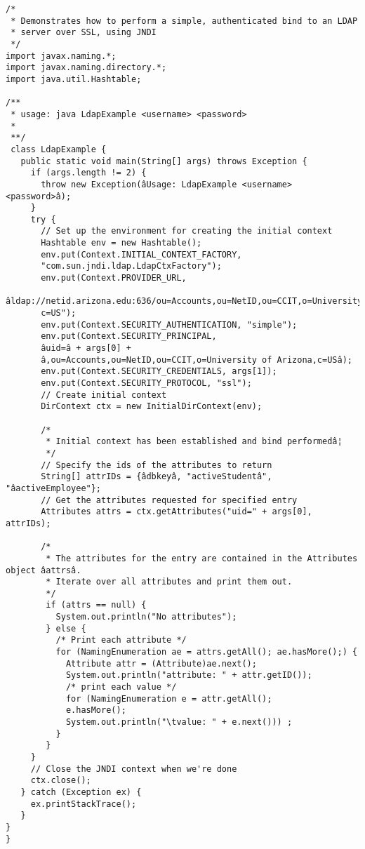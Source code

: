 \documentclass[12pt,notitlepage]{article}
\begin{document}
\begin{lstlisting}[caption=An example of search netid.arizona.edu for students and employees using Java.]
/*
 * Demonstrates how to perform a simple, authenticated bind to an LDAP
 * server over SSL, using JNDI
 */
import javax.naming.*;
import javax.naming.directory.*;
import java.util.Hashtable;

/**
 * usage: java LdapExample <username> <password>
 *
 **/
 class LdapExample {
   public static void main(String[] args) throws Exception {
     if (args.length != 2) {
       throw new Exception(âUsage: LdapExample <username> <password>â);
     }
     try {
       // Set up the environment for creating the initial context
       Hashtable env = new Hashtable();
       env.put(Context.INITIAL_CONTEXT_FACTORY,
       "com.sun.jndi.ldap.LdapCtxFactory");
       env.put(Context.PROVIDER_URL,
       âldap://netid.arizona.edu:636/ou=Accounts,ou=NetID,ou=CCIT,o=University%20of%20Arizona,
       c=US");
       env.put(Context.SECURITY_AUTHENTICATION, "simple");
       env.put(Context.SECURITY_PRINCIPAL,
       âuid=â + args[0] +
       â,ou=Accounts,ou=NetID,ou=CCIT,o=University of Arizona,c=USâ);
       env.put(Context.SECURITY_CREDENTIALS, args[1]);
       env.put(Context.SECURITY_PROTOCOL, "ssl");
       // Create initial context
       DirContext ctx = new InitialDirContext(env);

       /*
        * Initial context has been established and bind performedâ¦
        */
       // Specify the ids of the attributes to return
       String[] attrIDs = {âdbkeyâ, "activeStudentâ", "âactiveEmployee"};
       // Get the attributes requested for specified entry
       Attributes attrs = ctx.getAttributes("uid=" + args[0], attrIDs);

       /*
        * The attributes for the entry are contained in the Attributes object âattrsâ.
        * Iterate over all attributes and print them out.
        */
        if (attrs == null) {
          System.out.println("No attributes");
        } else {
          /* Print each attribute */
          for (NamingEnumeration ae = attrs.getAll(); ae.hasMore();) {
            Attribute attr = (Attribute)ae.next();
            System.out.println("attribute: " + attr.getID());
            /* print each value */
            for (NamingEnumeration e = attr.getAll();
            e.hasMore();
            System.out.println("\tvalue: " + e.next())) ;
          }
        }
     }
     // Close the JNDI context when we're done
     ctx.close();
   } catch (Exception ex) {
     ex.printStackTrace();
   }
}
}
\end{lstlisting}
\end{document}
